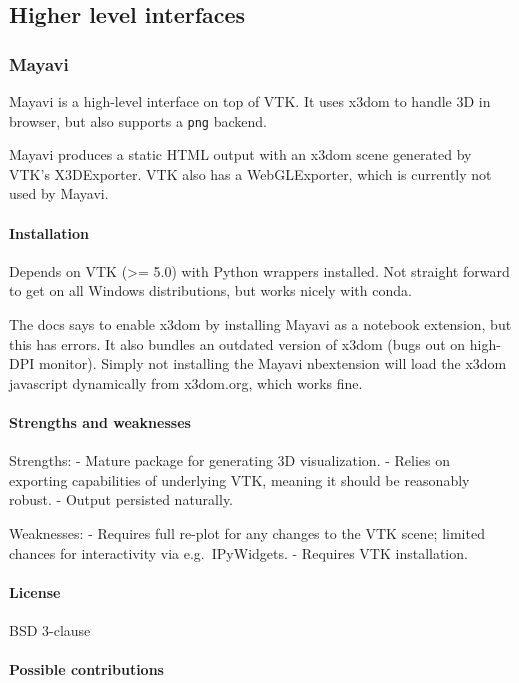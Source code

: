\subsection{Higher level interfaces}

\subsubsection{Mayavi}

Mayavi is a high-level interface on top of VTK. It uses x3dom to handle
3D in browser, but also supports a \texttt{png} backend.

Mayavi produces a static HTML output with an x3dom scene generated by
VTK's X3DExporter. VTK also has a WebGLExporter, which is currently not
used by Mayavi.

\paragraph{Installation}

Depends on VTK (\textgreater{}= 5.0) with Python wrappers installed. Not
straight forward to get on all Windows distributions, but works nicely
with conda.

The docs says to enable x3dom by installing Mayavi as a notebook
extension, but this has errors. It also bundles an outdated version of
x3dom (bugs out on high-DPI monitor). Simply not installing the Mayavi
nbextension will load the x3dom javascript dynamically from x3dom.org,
which works fine.

\paragraph{Strengths and weaknesses}

Strengths: - Mature package for generating 3D visualization. - Relies on
exporting capabilities of underlying VTK, meaning it should be
reasonably robust. - Output persisted naturally.

Weaknesses: - Requires full re-plot for any changes to the VTK scene;
limited chances for interactivity via e.g.~IPyWidgets. - Requires VTK
installation.

\paragraph{License}

BSD 3-clause

\paragraph{Possible contributions}

